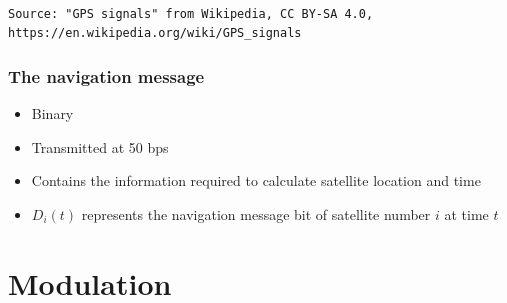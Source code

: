 \documentclass[aspectratio=169]{beamer}
\begin{document}
\begin{frame}
    \\
    \texttt{\tiny{Source: "GPS signals" from Wikipedia, CC BY-SA 4.0, https://en.wikipedia.org/wiki/GPS\_signals}}
\end{frame}

\begin{frame}
    \frametitle{The navigation message}

    \begin{itemize}
        \item<2-> Binary
        
        \item<3-> Transmitted at 50 bps
        
        \item<4-> Contains the information required to calculate satellite location and time
        
        \item<5-> $D_i(t)$ represents the navigation message bit of satellite number $i$ at time $t$
    \end{itemize}
\end{frame}

\section{Modulation}
\end{document}
